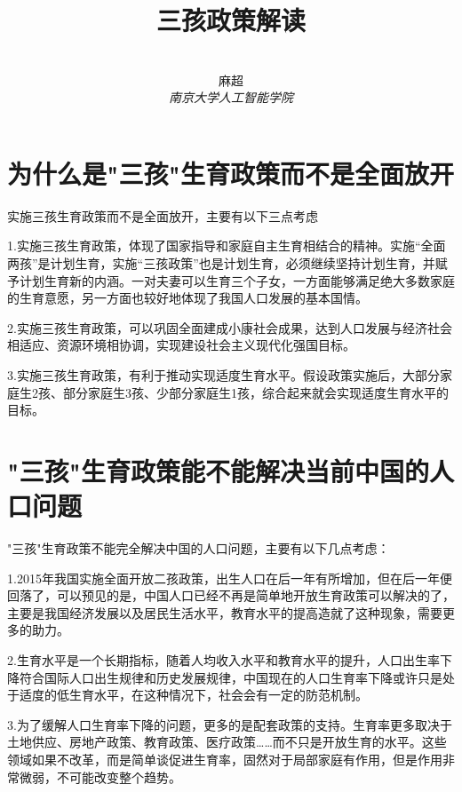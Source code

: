 \documentclass[12pt,a4paper]{ctexart}
\title{\textbf{三孩政策解读}}
\author{
\\
\Large{麻超 \quad 201300066}
\\[6pt]
{ \large \textit{南京大学人工智能学院}}\\[2pt]
}
\date{}
\begin{document}
\maketitle
\setcounter{page}{1}
\section{为什么是"三孩"生育政策而不是全面放开}
实施三孩生育政策而不是全面放开，主要有以下三点考虑

1.实施三孩生育政策，体现了国家指导和家庭自主生育相结合的精神。实施“全面两孩”是计划生育，实施“三孩政策”也是计划生育，必须继续坚持计划生育，并赋予计划生育新的内涵。一对夫妻可以生育三个子女，一方面能够满足绝大多数家庭的生育意愿，另一方面也较好地体现了我国人口发展的基本国情。

2.实施三孩生育政策，可以巩固全面建成小康社会成果，达到人口发展与经济社会相适应、资源环境相协调，实现建设社会主义现代化强国目标。

3.实施三孩生育政策，有利于推动实现适度生育水平。假设政策实施后，大部分家庭生2孩、部分家庭生3孩、少部分家庭生1孩，综合起来就会实现适度生育水平的目标。
\section{"三孩"生育政策能不能解决当前中国的人口问题}
"三孩"生育政策不能完全解决中国的人口问题，主要有以下几点考虑：

1.2015年我国实施全面开放二孩政策，出生人口在后一年有所增加，但在后一年便回落了，可以预见的是，中国人口已经不再是简单地开放生育政策可以解决的了，主要是我国经济发展以及居民生活水平，教育水平的提高造就了这种现象，需要更多的助力。

2.生育水平是一个长期指标，随着人均收入水平和教育水平的提升，人口出生率下降符合国际人口出生规律和历史发展规律，中国现在的人口生育率下降或许只是处于适度的低生育水平，在这种情况下，社会会有一定的防范机制。

3.为了缓解人口生育率下降的问题，更多的是配套政策的支持。生育率更多取决于土地供应、房地产政策、教育政策、医疗政策……而不只是开放生育的水平。这些领域如果不改革，而是简单谈促进生育率，固然对于局部家庭有作用，但是作用非常微弱，不可能改变整个趋势。
\end{document}
